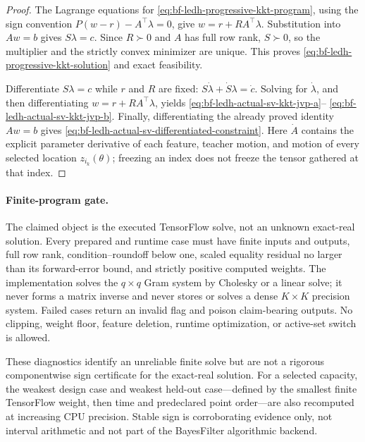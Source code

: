 \begin{proof}
The Lagrange equations for
\eqref{eq:bf-ledh-progressive-kkt-program}, using the sign convention
\(P(w-r)-A^\top\lambda=0\), give
\(w=r+RA^\top\lambda\).  Substitution into \(Aw=b\) gives
\(S\lambda=c\).  Since \(R\succ0\) and \(A\) has full row rank, \(S\succ0\),
so the multiplier and the strictly convex minimizer are unique.  This proves
\eqref{eq:bf-ledh-progressive-kkt-solution} and exact feasibility.

Differentiate \(S\lambda=c\) while \(r\) and \(R\) are fixed:
\(
  S\dot\lambda+\dot S\lambda=\dot c
\).
Solving for \(\dot\lambda\), and then differentiating
\(w=r+RA^\top\lambda\), yields
\eqref{eq:bf-ledh-actual-sv-kkt-jvp-a}--
\eqref{eq:bf-ledh-actual-sv-kkt-jvp-b}.  Finally, differentiating the already
proved identity \(Aw=b\) gives
\eqref{eq:bf-ledh-actual-sv-differentiated-constraint}.  Here \(\dot A\)
contains the explicit parameter derivative of each feature, teacher motion,
and motion of every selected location \(z_{i_k}(\theta)\); freezing an index
does not freeze the tensor gathered at that index.
\end{proof}

\paragraph{Finite-program gate.}
The claimed object is the executed TensorFlow solve, not an unknown exact-real
solution.  Every prepared and runtime case must have finite inputs and outputs,
full row rank, condition--roundoff below one, scaled equality residual no
larger than its forward-error bound, and strictly positive computed weights.
The implementation solves the \(q\times q\) Gram system by Cholesky or a linear
solve; it never forms a matrix inverse and never stores or solves a dense
\(K\times K\) precision system.  Failed cases return an invalid flag and poison
claim-bearing outputs.  No clipping, weight floor, feature deletion, runtime
optimization, or active-set switch is allowed.

These diagnostics identify an unreliable finite solve but are not a rigorous
componentwise sign certificate for the exact-real solution.  For a selected
capacity, the weakest design case and weakest held-out case---defined by the
smallest finite TensorFlow weight, then time and predeclared point order---are
also recomputed at increasing CPU precision.  Stable sign is corroborating
evidence only, not interval arithmetic and not part of the BayesFilter
algorithmic backend.

